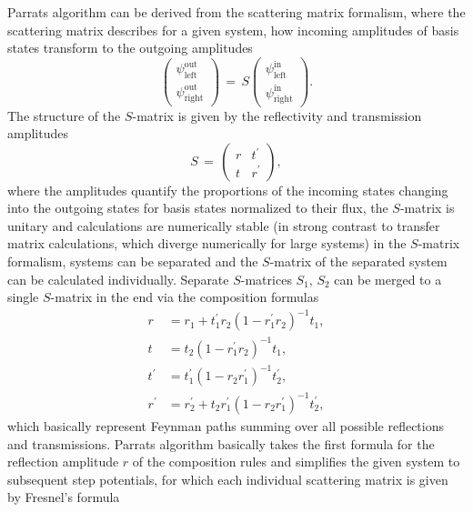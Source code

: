 \documentclass[\main/dresen_thesis.tex]{subfiles}
\begin{document}
    Parrats algorithm can be derived from the scattering matrix formalism, where the scattering matrix describes for a given system, how incoming amplitudes of basis states transform to the outgoing amplitudes
    \begin{equation}
    \begin{pmatrix}\psi_\mathrm{left}^\mathrm{out}\\\psi_\mathrm{right}^\mathrm{out}\end{pmatrix} \, = \, S \begin{pmatrix}\psi_\mathrm{left}^\mathrm{in}\\\psi_\mathrm{right}^\mathrm{in}\end{pmatrix}.
    \end{equation}
    The structure of the $S$-matrix is given by the reflectivity and transmission amplitudes
    \begin{equation}
    S \, = \, \begin{pmatrix}
    r& t^\prime\\
    t& r^\prime
    \end{pmatrix},
    \end{equation}
    where the amplitudes quantify the proportions of the incoming states changing into the outgoing states
    for basis states normalized to their flux, the $S$-matrix is unitary and calculations are numerically stable (in strong contrast to transfer matrix calculations, which diverge numerically for large systems)
    in the $S$-matrix formalism, systems can be separated and the $S$-matrix of the separated system can be calculated individually. Separate $S$-matrices $S_1, \, S_2$ can be merged to a single $S$-matrix in the end via the composition formulas
    \begin{align}
    r &= r_1 + t_1^{\prime} r_2 \left( 1-r_1^{\prime} r_2 \right)^{-1} t_1, \\
    t &= t_2\left( 1-r_1^{\prime} r_2 \right)^{-1} t_1, \\
    t^{\prime} &= t_1^{\prime} \left( 1- r_2 r_1^{\prime} \right)^{-1} t_2^{\prime}, \\
    r^{\prime} &= r_2^{\prime} + t_2 r_1^{\prime} \left( 1-r_2 r_1^{\prime} \right)^{-1} t_2^{\prime},
    \end{align}
    which basically represent Feynman paths summing over all possible reflections and transmissions.
    Parrats algorithm basically takes the first formula for the reflection amplitude $r$ of the composition rules and simplifies the given system to subsequent step potentials, for which each individual scattering matrix is given by Fresnel's formula
\end{document}
